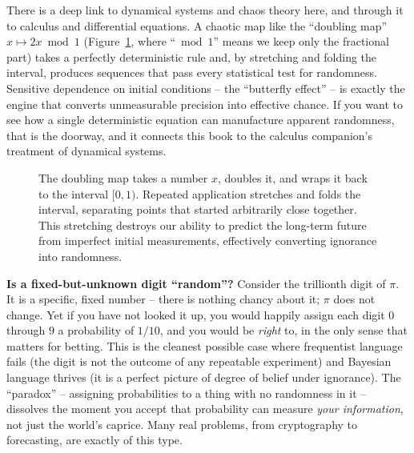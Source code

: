 \begin{connectionbox}
There is a deep link to dynamical systems and chaos theory here, and through it to
calculus and differential equations. A chaotic map like the ``doubling map''
$x \mapsto 2x \bmod 1$ (Figure~\ref{ch01:fig-doubling}, where ``$\bmod 1$'' means we keep only the fractional part) takes a perfectly deterministic rule and, by stretching and
folding the interval, produces sequences that pass every statistical test for
randomness. Sensitive dependence on initial conditions -- the ``butterfly effect''
-- is exactly the engine that converts unmeasurable precision into effective
chance. If you want to see how a single deterministic equation can manufacture
apparent randomness, that is the doorway, and it connects this book to the calculus
companion's treatment of dynamical systems.
\end{connectionbox}

\begin{figure}[H]
\centering
{}
\caption{The doubling map takes a number $x$, doubles it, and wraps it back to the interval $[0,1)$. Repeated application stretches and folds the interval, separating points that started arbitrarily close together. This stretching destroys our ability to predict the long-term future from imperfect initial measurements, effectively converting ignorance into randomness.}
\label{ch01:fig-doubling}
\end{figure}


\begin{paradoxbox}
\textbf{Is a fixed-but-unknown digit ``random''?} Consider the trillionth digit of
$\pi$. It is a specific, fixed number -- there is nothing chancy about it; $\pi$
does not change. Yet if you have not looked it up, you would happily assign each
digit $0$ through $9$ a probability of $1/10$, and you would be \emph{right} to, in
the only sense that matters for betting. This is the cleanest possible case where
frequentist language fails (the digit is not the outcome of any repeatable
experiment) and Bayesian language thrives (it is a perfect picture of degree of
belief under ignorance). The ``paradox'' -- assigning probabilities to a thing with
no randomness in it -- dissolves the moment you accept that probability can measure
\emph{your information}, not just the world's caprice. Many real problems, from
cryptography to forecasting, are exactly of this type.
\end{paradoxbox}


